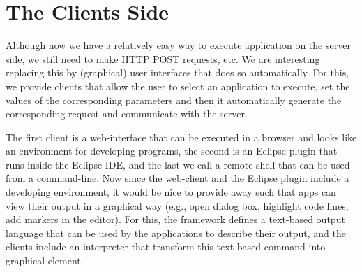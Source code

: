 \section{The Clients Side}
\label{ch:overview:arch:clients}

Although now we have a relatively easy way to execute application on
the server side, we still need to make HTTP POST requests, etc. We are
interesting replacing this by (graphical) user interfaces that does so
automatically. For this, we provide clients that allow the user to
select an application to execute, set the values of the corresponding
parameters and then it automatically generate the corresponding
request and communicate with the \ei server.

The first client is a web-interface that can be executed in a browser
and looks like an environment for developing programs, the second is
an Eclipse-plugin that runs inside the Eclipse IDE, and the last we
call a remote-shell that can be used from a command-line.
%
Now since the web-client and the Eclipse plugin include a developing
environment, it would be nice to provide away such that apps can view
their output in a graphical way (e.g., open dialog box, highlight code
lines, add markers in the editor). For this, the \ei framework defines
a text-based output language that can be used by the applications to
describe their output, and the clients include an interpreter that
transform this text-based command into graphical element.








